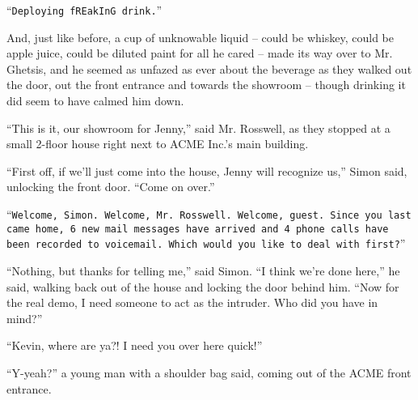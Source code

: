 \documentclass[10pt,a4paper]{article}
\newcommand{\lang}[2]{ #2 \par}
\newcommand{\ai}[2]{
	\lang{
		-- \texttt{#1}
	}{
		``\texttt{#2}''
	}
}
\newcommand{\ainame}{Jenny}
\newcommand{\mainname}{Simon}
\newcommand{\corpname}{ACME Inc.}
\newcommand{\corpnameshort}{ACME}
\newcommand{\ceoname}{Mr. Rosswell}
\newcommand{\policename}{Mr. Ghetsis}
\newcommand{\criminalname}{Kevin}
\begin{document}
\ai{Доставляю ГрЁБаНнЫй напиток}{Deploying fREakInG drink.}
\lang{И, как и в тот раз, стакан неопознаваемой жидкости -- может быть виски, может быть яблочный сок, может быть разведенная краска, уже было всё равно -- прилетела к \policename{}, и он опять был невозмутим по поводу напитка, пока они вместе вошли в лифт, вышли из парадного входа, и дошли до домика для демонстраций -- хотя, выпив его, он более-менее успокоился.}{And, just like before, a cup of unknowable liquid -- could be whiskey, could be apple juice, could be diluted paint for all he cared -- made its way over to \policename{}, and he seemed as unfazed as ever about the beverage as they walked out the door, out the front entrance and towards the showroom -- though drinking it did seem to have calmed him down.}

\lang{-- Вот мы и здесь, тут мы проводим демонстрации \ainame{}, -- сказал \ceoname{}, как только они дошли до маленького двухэтажного домика рядом с главным зданием \corpname{}.}{``This is it, our showroom for \ainame{},'' said \ceoname{}, as they stopped at a small 2-floor house right next to \corpname{}'s main building.}
\lang{-- Сначала, если мы просто зайдём в дом, \ainame{} узнает нас, -- сказал \mainname{}, открывая переднюю дверь. -- Добро пожаловать.}{``First off, if we'll just come into the house, \ainame{} will recognize us,'' \mainname{} said, unlocking the front door. ``Come on over.''}
\ai{Добрый день, \mainname{}. Добрый день, \ceoname{}. Добрый день, незнакомец. С вашего последнего входа почтальон принёс 6 новых писем, и вам было оставлено 4 сообщения на телефон. Что бы вы хотели посмотреть в первую очередь?}{Welcome, \mainname{}. Welcome, \ceoname{}. Welcome, guest. Since you last came home, 6 new mail messages have arrived and 4 phone calls have been recorded to voicemail. Which would you like to deal with first?}
\lang{-- Потом когда-то, но спасибо за напоминание, -- сказал \mainname{}. -- Думаю, дальше тут нам делать нечего, -- он продолжил, выходя из дома и запирая его. -- Для настоящей же демонстрации нужен кто-то, кто будет взломщиком. Вы кого предложили бы?}{``Nothing, but thanks for telling me,'' said \mainname{}. ``I think we're done here,'' he said, walking back out of the house and locking the door behind him. ``Now for the real demo, I need someone to act as the intruder. Who did you have in mind?''}
\lang{-- \criminalname{}, ты там где? Дуй быстро сюда!}{``\criminalname{}, where are ya?! I need you over here quick!''}
\lang{-- Я тут, что надо? -- сказал молодой человек с сумкой через плечо, вышедший из дверей \corpnameshort{}.}{``Y-yeah?'' a young man with a shoulder bag said, coming out of the \corpnameshort{} front entrance.}
\end{document}
